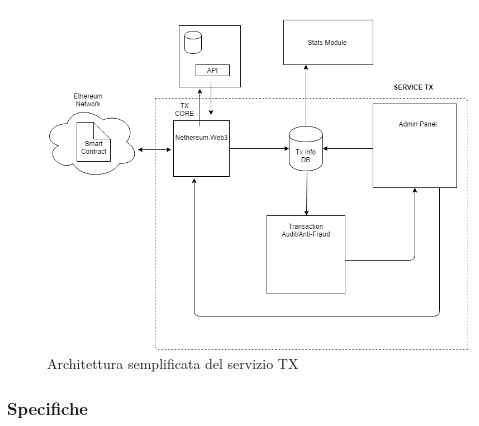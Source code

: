 \documentclass[11pt]{thesistemp}
\begin{document}
\begin{figure}[h]
    \centering
    \includegraphics[scale=0.41]{tx-arch.png}
        \caption{Architettura semplificata del servizio TX}
    \label{fig:tx-arch}
\end{figure}
\pagebreak

\subsubsection{Specifiche}
\end{document}
